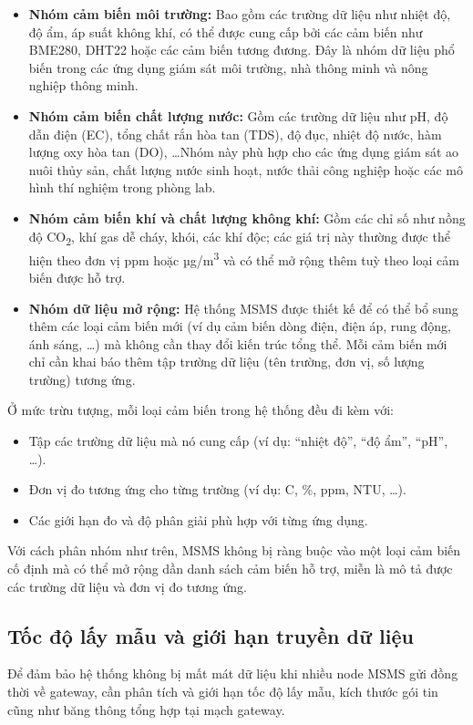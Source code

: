 \documentclass{article} %
\begin{document}
\begin{itemize}
    \item \textbf{Nhóm cảm biến môi trường:}  
    Bao gồm các trường dữ liệu như nhiệt độ, độ ẩm, áp suất không khí, có thể được cung cấp bởi các cảm biến như BME280, DHT22 hoặc các cảm biến tương đương. Đây là nhóm dữ liệu phổ biến trong các ứng dụng giám sát môi trường, nhà thông minh và nông nghiệp thông minh.

    \item \textbf{Nhóm cảm biến chất lượng nước:}  
    Gồm các trường dữ liệu như pH, độ dẫn điện (EC), tổng chất rắn hòa tan (TDS), độ đục, nhiệt độ nước, hàm lượng oxy hòa tan (DO), \dots Nhóm này phù hợp cho các ứng dụng giám sát ao nuôi thủy sản, chất lượng nước sinh hoạt, nước thải công nghiệp hoặc các mô hình thí nghiệm trong phòng lab.

    \item \textbf{Nhóm cảm biến khí và chất lượng không khí:}  
    Gồm các chỉ số như nồng độ CO\textsubscript{2}, khí gas dễ cháy, khói, các khí độc; các giá trị này thường được thể hiện theo đơn vị ppm hoặc µg/m\textsuperscript{3} và có thể mở rộng thêm tuỳ theo loại cảm biến được hỗ trợ.

    \item \textbf{Nhóm dữ liệu mở rộng:}  
    Hệ thống MSMS được thiết kế để có thể bổ sung thêm các loại cảm biến mới (ví dụ cảm biến dòng điện, điện áp, rung động, ánh sáng, \dots) mà không cần thay đổi kiến trúc tổng thể. Mỗi cảm biến mới chỉ cần khai báo thêm tập trường dữ liệu (tên trường, đơn vị, số lượng trường) tương ứng.
\end{itemize}

Ở mức trừu tượng, mỗi loại cảm biến trong hệ thống đều đi kèm với:
\begin{itemize}
    \item Tập các trường dữ liệu mà nó cung cấp (ví dụ: ``nhiệt độ'', ``độ ẩm'', ``pH'', \dots).
    \item Đơn vị đo tương ứng cho từng trường (ví dụ: \textdegree C, \%, ppm, NTU, \dots).
    \item Các giới hạn đo và độ phân giải phù hợp với từng ứng dụng.
\end{itemize}

Với cách phân nhóm như trên, MSMS không bị ràng buộc vào một loại cảm biến cố định mà có thể mở rộng dần danh sách cảm biến hỗ trợ, miễn là mô tả được các trường dữ liệu và đơn vị đo tương ứng.

\subsection{Tốc độ lấy mẫu và giới hạn truyền dữ liệu}
\label{tocdo}
Để đảm bảo hệ thống không bị mất mát dữ liệu khi nhiều node MSMS gửi đồng thời về gateway, cần phân tích và giới hạn tốc độ lấy mẫu, kích thước gói tin cũng như băng thông tổng hợp tại mạch gateway.
\end{document}
